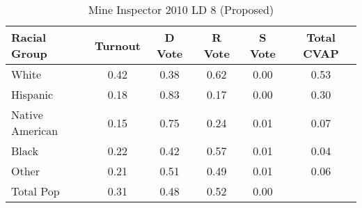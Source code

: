 \begin{table}[htb]
\begin{center}
\caption{Mine Inspector 2010 LD 8 (Proposed)}
\label{smine_cvap_ld_8}
\begin{tabular}{lccccc}
  \hline
Racial Group & Turnout & D Vote & R Vote & S Vote & Total CVAP \\ 
  \hline
White & 0.42 & 0.38 & 0.62 & 0.00 & 0.53 \\ 
  Hispanic & 0.18 & 0.83 & 0.17 & 0.00 & 0.30 \\ 
  Native American & 0.15 & 0.75 & 0.24 & 0.01 & 0.07 \\ 
  Black & 0.22 & 0.42 & 0.57 & 0.01 & 0.04 \\ 
  Other & 0.21 & 0.51 & 0.49 & 0.01 & 0.06 \\ 
  Total Pop & 0.31 & 0.48 & 0.52 & 0.00 &  \\ 
   \hline
\end{tabular}
\end{center}
\end{table}
